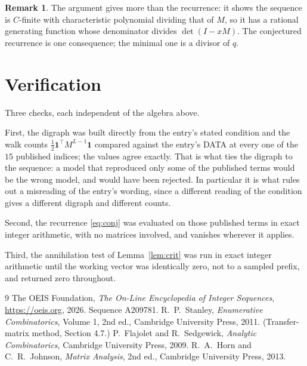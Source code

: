 \documentclass[11pt,a4paper]{article}
\theoremstyle{plain}
\theoremstyle{definition}
\newtheorem{remark}[theorem]{Remark}
\begin{document}
\begin{remark}
The argument gives more than the recurrence: it shows the sequence is $C$-finite with
characteristic polynomial dividing that of $M$, so it has a rational generating function
whose denominator divides $\det(I-xM)$. The conjectured recurrence is one consequence; the
minimal one is a divisor of $q$.
\end{remark}

\section{Verification}

Three checks, each independent of the algebra above.

First, the digraph was built directly from the entry's stated condition and the walk counts
$\tfrac1{2}\mathbf{1}^{\!\top}M^{L-1}\mathbf{1}$ compared against the entry's DATA at
every one of the $15$ published indices; the values agree exactly. That is what ties
the digraph to the sequence: a model that reproduced only some of the published terms would
be the wrong model, and would have been rejected. In particular it is what rules out a
misreading of the entry's wording, since a different reading of the condition gives a
different digraph and different counts.

Second, the recurrence \eqref{eq:conj} was evaluated on those published terms in exact
integer arithmetic, with no matrices involved, and vanishes wherever it applies.

Third, the annihilation test of Lemma~\ref{lem:crit} was run in exact integer arithmetic
until the working vector was identically zero, not to a sampled prefix, and returned zero
throughout.

\begin{thebibliography}{9}
 The OEIS Foundation, \emph{The On-Line Encyclopedia of Integer
Sequences}, \url{https://oeis.org}, 2026. Sequence A209781.
 R.~P.~Stanley, \emph{Enumerative Combinatorics}, Volume 1, 2nd ed.,
Cambridge University Press, 2011. (Transfer-matrix method, Section 4.7.)
 P.~Flajolet and R.~Sedgewick, \emph{Analytic Combinatorics}, Cambridge
University Press, 2009.
 R.~A.~Horn and C.~R.~Johnson, \emph{Matrix Analysis}, 2nd ed., Cambridge
University Press, 2013.
\end{thebibliography}
\end{document}
